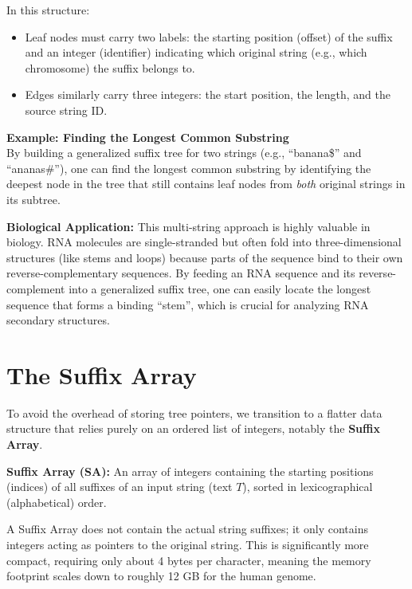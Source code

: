 In this structure:
\begin{itemize}
    \item Leaf nodes must carry two labels: the starting position (offset) of the suffix and an integer (identifier) indicating which original string (e.g., which chromosome) the suffix belongs to.
    \item Edges similarly carry three integers: the start position, the length, and the source string ID.
\end{itemize}

\textbf{Example: Finding the Longest Common Substring}\\
By building a generalized suffix tree for two strings (e.g., ``banana\$'' and ``ananas\#''), one can find the longest common substring by identifying the deepest node in the tree that still contains leaf nodes from \textit{both} original strings in its subtree.

\sta \textbf{Biological Application:} This multi-string approach is highly valuable in biology. RNA molecules are single-stranded but often fold into three-dimensional structures (like stems and loops) because parts of the sequence bind to their own reverse-complementary sequences. By feeding an RNA sequence and its reverse-complement into a generalized suffix tree, one can easily locate the longest sequence that forms a binding ``stem'', which is crucial for analyzing RNA secondary structures.

\section{The Suffix Array}

To avoid the overhead of storing tree pointers, we transition to a flatter data structure that relies purely on an ordered list of integers, notably the \textbf{Suffix Array}.

\begin{important}
    \textbf{Suffix Array (SA):} An array of integers containing the starting positions (indices) of all suffixes of an input string (text \( T \)), sorted in lexicographical (alphabetical) order. 
\end{important}

A Suffix Array does not contain the actual string suffixes; it only contains integers acting as pointers to the original string. This is significantly more compact, requiring only about 4 bytes per character, meaning the memory footprint scales down to roughly 12 GB for the human genome.

